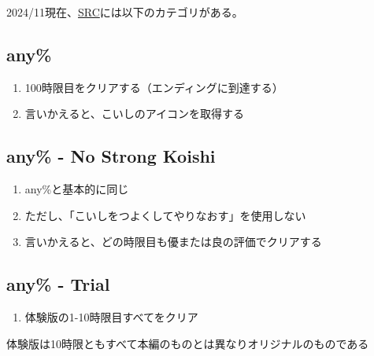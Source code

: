 


2024/11現在、\href{https://www.speedrun.com/komeiji_satori_no_jousou_kyouiku}{SRC}には以下のカテゴリがある。


\subsection{any\%}
\begin{enumerate}[label={\sarrow}]
\item 100時限目をクリアする（エンディングに到達する）
\item 言いかえると、こいしのアイコンを取得する
\end{enumerate}


\subsection{any\% - No Strong Koishi}
\begin{enumerate}[label={\sarrow}]
\item any\%と基本的に同じ
\item ただし、「こいしをつよくしてやりなおす」を使用しない
\item 言いかえると、どの時限目も優または良の評価でクリアする
\end{enumerate}


\subsection{any\% - Trial}
\begin{enumerate}[label={\sarrow}]
\item 体験版の1-10時限目すべてをクリア
\end{enumerate}
\begin{marker}
体験版は10時限ともすべて本編のものとは異なりオリジナルのものである
\end{marker}



